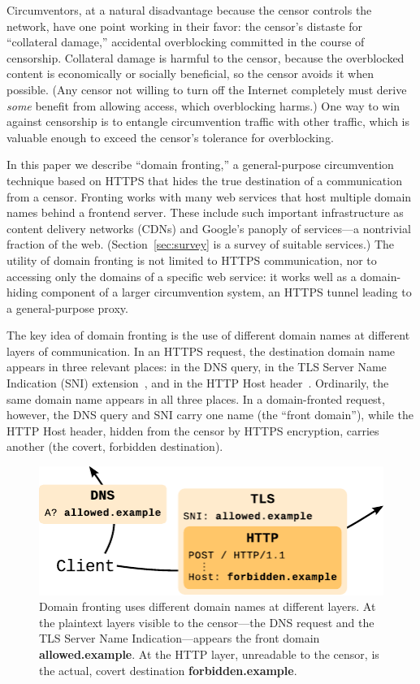 \documentclass{sig-alternate}
\begin{document}
Circumventors,
at a natural disadvantage because the censor controls the network,
have one point working in their favor:
the censor's distaste for ``collateral damage,''
accidental overblocking committed in the course of censorship.
Collateral damage is harmful to the censor,
because the overblocked content is economically or socially beneficial,
so the censor avoids it when possible.
(Any censor not willing to turn off the Internet completely
must derive \emph{some} benefit from allowing access,
which overblocking harms.)
One way to win against censorship is to entangle circumvention traffic
with other traffic, which is valuable enough to
exceed the censor's tolerance for overblocking.

In this paper we describe ``domain fronting,'' a general-purpose circumvention technique
based on HTTPS that hides the true destination of a communication
from a censor.
Fronting works with many web services that host multiple domain names
behind a frontend server.
These include such important infrastructure as
content delivery networks (CDNs)
and Google's panoply of services---a nontrivial fraction of the web.
(Section~\ref{sec:survey} is a survey of suitable services.)
The utility of domain fronting is not limited to HTTPS communication,
nor to accessing only the domains of a specific web service:
it works well as a domain-hiding component of a larger circumvention system,
an HTTPS tunnel leading to a general-purpose proxy.

The key idea of domain fronting is the use of
different domain names at different layers of communication.
In an HTTPS request, the destination domain name appears
in three relevant places:
in the DNS query,
in the TLS Server Name Indication (SNI) extension~\cite[\S 3]{rfc6066},
and in the HTTP Host header~\cite[\S 14.23]{rfc2616}.
Ordinarily, the same domain name appears in all three places.
In a domain-fronted request, however,
the DNS query and SNI carry one name (the ``front domain''),
while the HTTP Host header,
hidden from the censor by HTTPS encryption,
carries another (the covert, forbidden destination).

\begin{figure}[ht]
\centering
\includegraphics[width=\linewidth]{fronting-diagram}
\caption{
Domain fronting uses different domain names at different layers.
At the plaintext layers visible to the censor---the DNS request and the
TLS Server Name Indication---appears
the front domain \mbox{\textbf{allowed.example}}.
At the HTTP layer, unreadable to the censor,
is the actual, covert destination \mbox{\textbf{forbidden.example}}.
}
\label{fig:fronting}
\end{figure}
\end{document}
